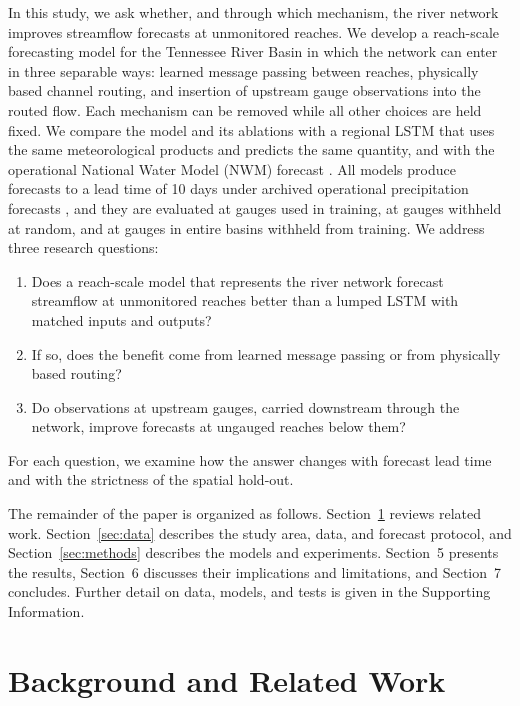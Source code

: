 \documentclass[draft]{agujournal2019}
\begin{document}
In this study, we ask whether, and through which mechanism, the river network improves streamflow forecasts at unmonitored reaches. We develop a reach-scale forecasting model for the Tennessee River Basin in which the network can enter in three separable ways: learned message passing between reaches, physically based channel routing, and insertion of upstream gauge observations into the routed flow. Each mechanism can be removed while all other choices are held fixed. We compare the model and its ablations with a regional LSTM that uses the same meteorological products and predicts the same quantity, and with the operational National Water Model (NWM) forecast \cite{Cosgrove2024}. All models produce forecasts to a lead time of 10 days under archived operational precipitation forecasts \cite{Zhou2022,Guan2022}, and they are evaluated at gauges used in training, at gauges withheld at random, and at gauges in entire basins withheld from training. We address three research questions:
\begin{enumerate}
\item Does a reach-scale model that represents the river network forecast streamflow at unmonitored reaches better than a lumped LSTM with matched inputs and outputs?
\item If so, does the benefit come from learned message passing or from physically based routing?
\item Do observations at upstream gauges, carried downstream through the network, improve forecasts at ungauged reaches below them?
\end{enumerate}
For each question, we examine how the answer changes with forecast lead time and with the strictness of the spatial hold-out.

The remainder of the paper is organized as follows. Section~\ref{sec:background} reviews related work. Section~\ref{sec:data} describes the study area, data, and forecast protocol, and Section~\ref{sec:methods} describes the models and experiments. Section~5 presents the results, Section~6 discusses their implications and limitations, and Section~7 concludes. Further detail on data, models, and tests is given in the Supporting Information.


\section{Background and Related Work}
\label{sec:background}
\end{document}
